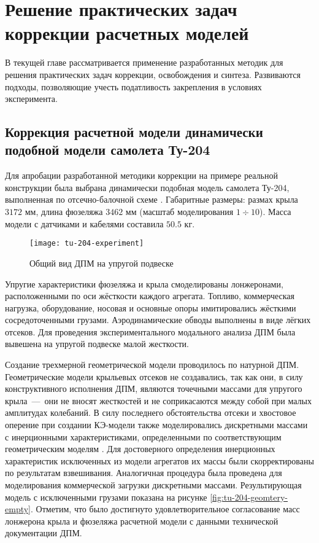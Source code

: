 \chapter{Решение практических задач коррекции расчетных моделей} 

В текущей главе рассматривается применение разработанных методик для решения практических задач коррекции, освобождения и синтеза. Развиваются подходы, позволяющие учесть податливость закрепления в условиях эксперимента. 

\section{Коррекция расчетной модели динамически подобной модели самолета \mbox{Ту-204}}

Для апробации разработанной методики коррекции на примере реальной конструкции была выбрана динамически подобная модель самолета \mbox{Ту-204}, выполненная по отсечно-балочной схеме . Габаритные размеры: размах крыла $ 3172 $ мм, длина фюзеляжа $ 3462 $ мм (масштаб моделирования $ 1 \div 10 $). Масса модели с датчиками и кабелями составила $ 50.5 $ кг.

\begin{figure}[!htb]
	\centerfloat
	\texttt{[image: tu-204-experiment]}
	\caption{Общий вид ДПМ на упругой подвеске} \label{fig:tu-204-experiment}	
\end{figure}

Упругие характеристики фюзеляжа и крыла смоделированы лонжеронами, расположенными по оси жёсткости каждого агрегата. Топливо, коммерческая нагрузка, оборудование, носовая и основные опоры имитировались жёсткими сосредоточенными грузами. Аэродинамические обводы выполнены в виде лёгких отсеков. Для проведения экспериментального модального анализа ДПМ была вывешена на упругой подвеске малой жесткости.

Создание трехмерной геометрической модели  проводилось по натурной ДПМ. Геометрические модели крыльевых отсеков не создавались, так как они, в силу конструктивного исполнения ДПМ, являются точечными массами для упругого крыла~---~они не вносят жесткостей и не соприкасаются между собой при малых амплитудах колебаний. В силу последнего обстоятельства отсеки и хвостовое оперение при создании КЭ-модели также моделировались дискретными массами с инерционными характеристиками, определенными по соответствующим геометрическим моделям . Для достоверного определения инерционных характеристик исключенных из модели агрегатов их массы были скорректированы по результатам взвешивания. Аналогичная процедура была проведена для моделирования коммерческой загрузки дискретными массами. Результирующая модель с исключенными грузами показана на рисунке \ref{fig:tu-204-geomtery-empty}. Отметим, что было достигнуто удовлетворительное согласование масс лонжерона крыла и фюзеляжа расчетной модели с данными технической документации ДПМ.

